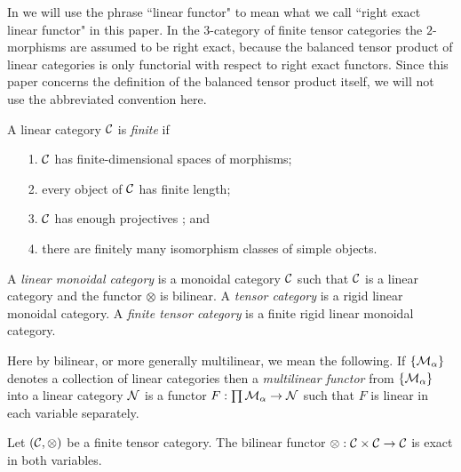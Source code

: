 \documentclass{amsart}
\begin{document}
\begin{warning}
	In \cite{DTCI} we will use the phrase ``linear functor" to mean what we call ``right exact linear functor" in this paper.  In the $3$-category of finite tensor categories the $2$-morphisms are assumed to be right exact, because the balanced tensor product of linear categories is only functorial with respect to right exact functors.  Since this paper concerns the definition of the balanced tensor product itself, we will not use the abbreviated convention here.
\end{warning}

\begin{definition} %
	A linear category $\mathcal C$ is {\em finite} if 
	\begin{enumerate}
		\item[1.] $\mathcal C$ has finite-dimensional spaces of morphisms;
		\item[2.] every object of $\mathcal C$ has finite length;
		\item[3.] $\mathcal C$ has enough projectives%
		; and
		\item[4.] there are finitely many isomorphism classes of simple objects.  
	\end{enumerate}
\end{definition}

\begin{definition}
	A {\em linear monoidal category} is a monoidal category $\mathcal C$ such that $\mathcal C$ is a linear category and the functor $\otimes$ is bilinear.  A {\em tensor category} is a rigid linear monoidal category.  A {\em finite tensor category} is a finite rigid linear monoidal category.
\end{definition}

\nid Here by bilinear, or more generally multilinear, we mean the following.  If $\{\mathcal M_\alpha\}$ denotes a collection of linear categories then a {\em multilinear functor} from $\{\mathcal M_\alpha\}$ into a linear category $\mathcal N$ is a functor $F: \prod \mathcal M_\alpha \to \mathcal N$ such that $F$ is linear in each variable separately. 

\begin{lemma} \cite[2.1.8]{MR1797619} \cite[Prop. 1.13.1]{EGNO}  \label{lma:RigidIsExact}
	Let $(\mathcal C, \otimes)$ be a finite tensor category. The bilinear functor $\otimes: \mathcal C \times \mathcal C \to \mathcal C$ is exact in both variables. 
\end{lemma}
\end{document}

